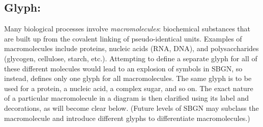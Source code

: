 
\subsection{Glyph: }
\label{sec:macromolecule}

Many biological processes involve \emph{macromolecules}: biochemical substances that are built up from the covalent linking of pseudo-identical units.  Examples of macromolecules include proteins, nucleic acids (RNA, DNA), and polysaccharides (glycogen, cellulose, starch, etc.).  Attempting to define a separate glyph for all of these different molecules would lead to an explosion of symbols in SBGN, so instead, \SBGNPDLone defines only one glyph for all macromolecules.  The same glyph is to be used for a protein, a nucleic acid, a complex sugar, and so on.  The exact nature of a particular macromolecule in a diagram is then clarified using its label and decorations, as will become clear below.  (Future levels of SBGN may subclass the macromolecule and introduce different glyphs to differentiate macromolecules.)

